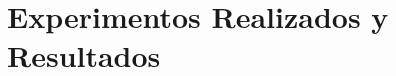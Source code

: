 \chapter{Experimentos Realizados y Resultados}
\label{chap:experimentos}


\label{sect:sistemasreferencia}

\label{sect:escenarios_pruebas}
 
